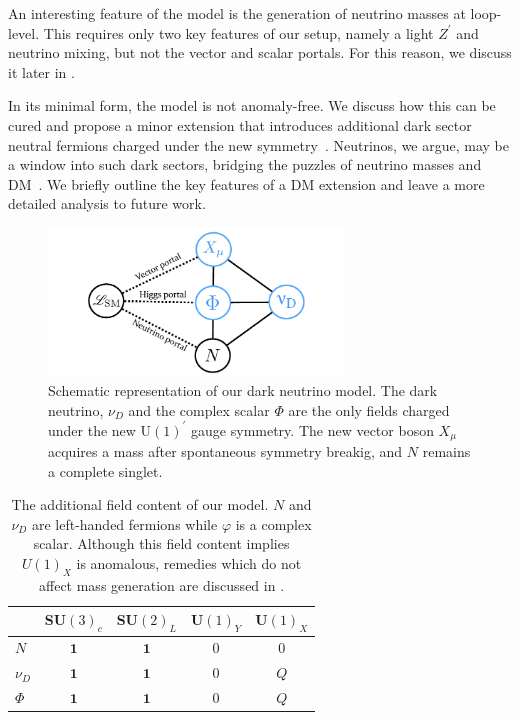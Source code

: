 An interesting feature of the model is the generation of neutrino masses at loop-level. This requires only two key features of our setup, namely a light $Z^\prime$ and neutrino mixing, but not the vector and scalar portals. For this reason, we discuss it later in .

In its minimal form, the model is not anomaly-free. We discuss how this can be cured and propose a minor extension that introduces additional dark sector neutral fermions charged under the new symmetry~\cite{Boehm:2003hm,Boehm:2003ha}. Neutrinos, we argue, may be a window into such dark sectors, bridging the puzzles of neutrino masses and DM~\cite{Ma:2006km,Farzan:2009ji,Farzan:2010mr,Arhrib:2015dez,Cherry:2014xra,Escudero:2016tzx,Escudero:2016ksa,Batell:2017cmf,Capozzi:2017auw,Campo:2017nwh,Blennow:2019fhy}. We briefly outline the key features of a DM extension and leave a more detailed analysis to future work.
%
\begin{figure}[t]
\centering\includegraphics[width=0.7\textwidth]{portals.pdf}
\caption[Dark neutrino model diagram.]{Schematic representation of our dark neutrino model. The dark neutrino, $\nu_{D}$ and the complex scalar $\Phi$ are the only fields charged under the new U$(1)^\prime$ gauge symmetry. The new vector boson $X_\mu$ acquires a mass after spontaneous symmetry breakig, and $N$ remains a complete singlet.
\label{fig:dark_nus_model}}
\end{figure}
%
\begin{table}[h]
\centering
\begin{tabular}{l | c c c c}
~ & SU$(3)_c$ & SU$(2)_L$ & U$(1)_Y$ & U$(1)_X$\\
\hline
$N$ & $\mathbf{1}$ & $\mathbf{1}$ & 0 & 0\\
$\nu_D$ & $\mathbf{1}$ & $\mathbf{1}$ & 0 & $Q$\\
$\Phi$ & $\mathbf{1}$ & $\mathbf{1}$ & 0 & $Q$\\
\end{tabular}
%
\caption[Dark neutrino model particle content.]{\label{tab:fields}The additional field content of our model. $N$ and $\nu_D$ are left-handed fermions while $\varphi$ is a complex scalar. Although this field content implies $U(1)_X$ is anomalous, remedies which do not affect mass generation are discussed in .}
%
\end{table}
